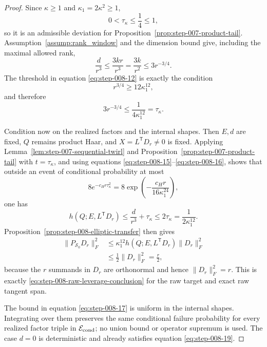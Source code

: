 \begin{proof}
Since \(\kappa\ge1\) and
\(\kappa_1=2\kappa^2\ge1\),
\begin{equation}
  0<\tau_\kappa\le\frac14\le1,                            \label{eq:step-008-14}
\end{equation}
so it is an admissible deviation for
Proposition~\ref{prop:step-007-product-tail}. Assumption~\ref{assump:rank_window}
and the dimension bound give, including the maximal allowed rank,
\begin{equation}
  \frac d{r^3}
  \le\frac{3kr}{r^3}
  =\frac{3k}{r^2}
  \le3r^{-3/4}.                                             \label{eq:step-008-15}
\end{equation}
The threshold in equation \eqref{eq:step-008-12} is exactly the condition
\[
  r^{3/4}\ge12\kappa_1^{12},
\]
and therefore
\begin{equation}
  3r^{-3/4}\le\frac1{4\kappa_1^{12}}=\tau_\kappa.          \label{eq:step-008-16}
\end{equation}

Condition now on the realized factors and the internal shapes. Then
\(E,d\) are fixed, \(Q\) remains product Haar, and
\(X=L^{\mathsf T}D_r\ne0\) is fixed. Applying
Lemma~\ref{lem:step-007-sequential-twirl} and
Proposition~\ref{prop:step-007-product-tail} with
\(t=\tau_\kappa\), and using equations
\eqref{eq:step-008-15}--\eqref{eq:step-008-16}, shows that outside an
event of conditional probability at most
\begin{equation}
  8e^{-c_Hr\tau_\kappa^2}
  =8\exp\!\left(-\frac{c_Hr}{16\kappa_1^{24}}\right),       \label{eq:step-008-17}
\end{equation}
one has
\begin{equation}
  h(Q;E,L^{\mathsf T}D_r)
  \le\frac d{r^3}+\tau_\kappa
  \le2\tau_\kappa
  =\frac1{2\kappa_1^{12}}.                                 \label{eq:step-008-18}
\end{equation}
Proposition~\ref{prop:step-008-elliptic-transfer} then gives
\begin{equation}
\begin{aligned}
  \|P_{\mathscr S_0}D_r\|_F^2
  &\le\kappa_1^{12}h(Q;E,L^{\mathsf T}D_r)\|D_r\|_F^2\\
  &\le\frac12\|D_r\|_F^2
   =\frac r2,
\end{aligned}\label{eq:step-008-19}
\end{equation}
because the \(r\) summands in \(D_r\) are orthonormal and hence
\(\|D_r\|_F^2=r\). This is exactly
\eqref{eq:step-008-raw-leverage-conclusion} for the raw target and exact raw
tangent span.

The bound in equation \eqref{eq:step-008-17} is uniform in the internal shapes. Integrating
over them preserves the same conditional failure probability for every
realized factor triple in \(\mathcal E_{\rm cond}\); no union bound or
operator supremum is used. The case \(d=0\) is deterministic and already
satisfies equation \eqref{eq:step-008-19}. 

\end{proof}


